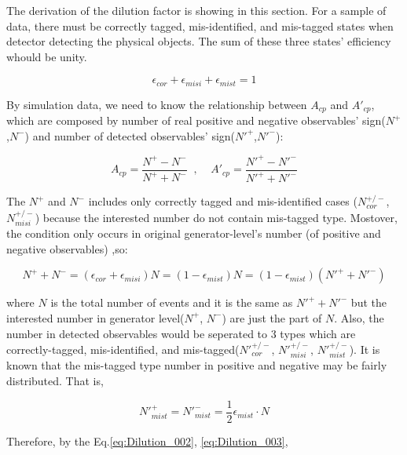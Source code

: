 		The derivation of the dilution factor is showing in this section. For a sample of data, there must be correctly tagged, mis-identified, and mis-tagged states when detector detecting the physical objects. The sum of these three states' efficiency whould be unity.

		\begin{equation}
		\epsilon_{cor} + \epsilon_{misi} + \epsilon_{mist} = 1
		\label{eq:Dilution_unity}
		\end{equation}
		\FloatBarrier

		By simulation data, we need to know the relationship between $A_{cp}$ and $A'_{cp}$, which are composed by number of real positive and negative observables' sign($N^{+}$,$N^{-}$) and number of detected observables' sign($N'^{+}$,$N'^{-}$):

		\begin{equation}
		A_{cp} = \frac{ N^{+} - N^{-} }{ N^{+} + N^{-} } \;\;, \;\;\;\; 
		A'_{cp} = \frac{ N'^{+} - N'^{-} }{ N'^{+} + N'^{-} }
		\label{eq:Dilution_001}
		\end{equation}
		\FloatBarrier
		

		The $N^+$ and $N^-$ includes only correctly tagged and mis-identified cases ($N^{+/-}_{cor}$,$N^{+/-}_{misi}$) because the interested number do not contain mis-tagged type. Mostover, the condition only occurs in original generator-level's number (of positive and negative observables) ,so:

		\begin{equation}
		N^+ + N^- = (\epsilon_{cor} + \epsilon_{misi})N = (1-\epsilon_{mist})N = (1-\epsilon_{mist})(N'^+ + N'^-)
		\label{eq:Dilution_002}
		\end{equation}
		\FloatBarrier

		where $N$ is the total number of events and it is the same as $N'^+ + N'^-$ but the interested number in generator level($N^+$, $N^-$) are just the part of $N$. Also, the number in detected observables would be seperated to 3 types which are correctly-tagged, mis-identified, and mis-tagged($N'^{+/-}_{cor}$, $N'^{+/-}_{misi}$, $N'^{+/-}_{mist}$). It is known that the mis-tagged type number in positive and negative may be fairly distributed. That is, 

		\begin{equation}
		N'^+_{mist} = N'^-_{mist} = \frac{1}{2}\epsilon_{mist} \cdot N
		\label{eq:Dilution_003}
		\end{equation}
		\FloatBarrier

		Therefore, by the Eq.\ref{eq:Dilution_002}, \ref{eq:Dilution_003}, 

